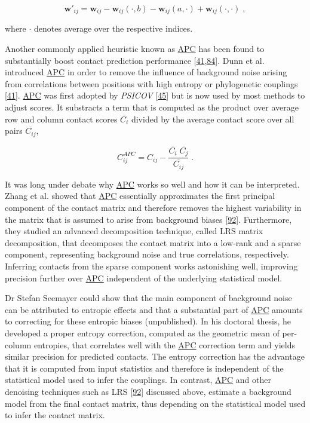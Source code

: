 \documentclass[12pt,a4paper,twoside]{book}
\newcommand{\w}{\mathbf{w}}
\newcommand{\wij}{\mathbf{w}_{ij}}
\theoremstyle{definition}
\theoremstyle{definition}
\theoremstyle{remark}
\begin{document}
\begin{equation}
    \w\prime_{ij}  = \wij - \wij(\cdot, b) - \wij(a, \cdot) + \wij(\cdot, \cdot) \; ,
\label{eq:zero-sum-gauge-transform}
\end{equation}

where \(\cdot\) denotes average over the respective indices.

Another commonly applied heuristic known as
\protect\hyperlink{abbrev}{APC} has been found to substantially boost
contact prediction performance
{[}\protect\hyperlink{ref-Dunn2008}{41},\protect\hyperlink{ref-Kamisetty2013}{84}{]}.
Dunn et al. introduced \protect\hyperlink{abbrev}{APC} in order to
remove the influence of background noise arising from correlations
between positions with high entropy or phylogenetic couplings
{[}\protect\hyperlink{ref-Dunn2008}{41}{]}.
\protect\hyperlink{abbrev}{APC} was first adopted by \emph{PSICOV}
{[}\protect\hyperlink{ref-Jones2012}{45}{]} but is now used by most
methods to adjust scores. It substracts a term that is computed as the
product over average row and column contact scores \(\overline{C_i}\)
divided by the average contact score over all pairs
\(\overline{C_{ij}}\),

\begin{equation}
    C_{ij}^{APC}  = C_{ij} - \frac{\overline{C_i} \; \overline{C_j}}{\overline{C_{ij}}}\; .
\label{eq:apc}
\end{equation}

It was long under debate why \protect\hyperlink{abbrev}{APC} works so
well and how it can be interpreted. Zhang et al. showed that
\protect\hyperlink{abbrev}{APC} essentially approximates the first
principal component of the contact matrix and therefore removes the
highest variability in the matrix that is assumed to arise from
background biases {[}\protect\hyperlink{ref-Zhang2016}{92}{]}.
Furthermore, they studied an advanced decomposition technique, called
LRS matrix decomposition, that decomposes the contact matrix into a
low-rank and a sparse component, representing background noise and true
correlations, respectively.\\
Inferring contacts from the sparse component works astonishing well,
improving precision further over \protect\hyperlink{abbrev}{APC}
independent of the underlying statistical model.

Dr Stefan Seemayer could show that the main component of background
noise can be attributed to entropic effects and that a substantial part
of \protect\hyperlink{abbrev}{APC} amounts to correcting for these
entropic biases (unpublished). In his doctoral thesis, he developed a
proper entropy correction, computed as the geometric mean of per-column
entropies, that correlates well with the \protect\hyperlink{abbrev}{APC}
correction term and yields similar precision for predicted contacts. The
entropy correction has the advantage that it is computed from input
statistics and therefore is independent of the statistical model used to
infer the couplings. In contrast, \protect\hyperlink{abbrev}{APC} and
other denoising techniques such as LRS
{[}\protect\hyperlink{ref-Zhang2016}{92}{]} discussed above, estimate a
background model from the final contact matrix, thus depending on the
statistical model used to infer the contact matrix.
\end{document}
